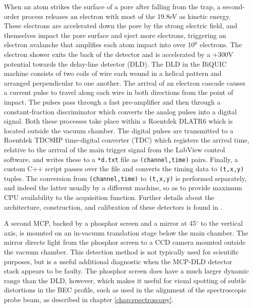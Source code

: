 	When an atom strikes the surface of a pore after falling from the trap, a second-order process releases an electron with most of the  19.8eV as kinetic energy\cite{ThatPaper}. These electrons are accelerated down the pore by the strong electric field, and themselves impact the pore surface and eject more electrons, triggering an electron avalanche that amplifies each atom impact into over 10$^6$ electrons. The electron shower exits the back of the detector and is accelerated by a +300V potential towards the delay-line detector (DLD). The DLD in the BiQUIC machine consists of two coils of wire each wound in a helical pattern and arranged perpendicular to one another.  The arrival of an electron cascade causes a current pulse to travel along each wire in both directions from the point of impact. The pulses pass through a fast pre-amplifier and then through a constant-fraction discriminator which converts the analog pulses into a digital signal. Both these processes take place within a Roentdek DLATR6 which is located outside the vacuum chamber. The digital pulses are transmitted to a Roentdek TDC8HP time-digital converter (TDC) which registers the arrival time, relative to the arrival of the main trigger signal from the LabView control software, and writes these to a \verb|*d.txt| file as \verb|(channel,time)| pairs. Finally, a custom C++ script passes over the file and converts the timing data to \verb|(t,x,y)| tuples. The conversion from \verb|(channel,time)| to \verb|(t,x,y)| is performed separately, and indeed the latter usually by a different machine, so as to provide maximum CPU availability to the acquisition function.	Further details about the architecture, construction, and calibration of these detectors is found in \cite{HodgmanThesis,ManningThesis}.

	A second MCP, backed by a phosphor screen and a mirror at 45$^\circ$ to the vertical axis, is mounted on an in-vacuum translation stage below the main chamber. The mirror directs light from the phosphor screen to a CCD camera mounted outside the vacuum chamber. This detection method is not typically used for scientific purposes, but is a useful additional diagnostic when the MCP-DLD detector stack appears to be faulty. The phosphor screen does have a much larger dynamic range than the DLD, however, which makes it useful for visual spotting of subtle distortions in the BEC profile, such as used in the alignment of the spectroscopic probe beam, as described in chapter \ref{chap:spectroscopy}. 


